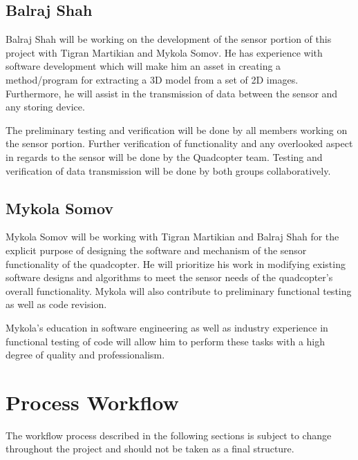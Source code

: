 \documentclass[10pt,letterpaper]{article}
\begin{document}
\subsection{Balraj Shah}
Balraj Shah will be working on the development of the sensor portion of this project with Tigran Martikian and Mykola Somov. He has experience with software development which will make him an asset in creating a method/program for extracting a 3D model from a set of 2D images. Furthermore, he will assist in the transmission of data between the sensor and any storing device.\par
The preliminary testing and verification will be done by all members working on the sensor portion. Further verification of functionality and any overlooked aspect in regards to the sensor will be done by the Quadcopter team. Testing and verification of data transmission will be done by both groups collaboratively.

\subsection{Mykola Somov} 
Mykola Somov will be working with Tigran Martikian and Balraj Shah for the explicit purpose of designing the software and mechanism of the sensor functionality of the quadcopter. He will prioritize his work in modifying existing software designs and algorithms to meet the sensor needs of the quadcopter's overall functionality. Mykola will also contribute to preliminary functional testing as well as code revision. \par
Mykola's education in software  engineering as well as industry experience in functional testing of code  will allow him to perform these tasks with a high degree of quality and professionalism. 

\newpage 


\section{Process Workflow}
The workflow process described in the following sections is subject to change throughout the project and should not be taken as a final structure.
\end{document}
